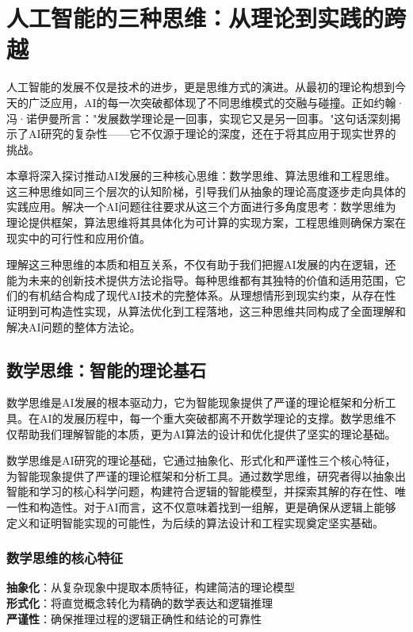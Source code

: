 
\chapter{人工智能的三种思维：从理论到实践的跨越}

人工智能的发展不仅是技术的进步，更是思维方式的演进。从最初的理论构想到今天的广泛应用，AI的每一次突破都体现了不同思维模式的交融与碰撞。正如约翰·冯·诺伊曼所言："发展数学理论是一回事，实现它又是另一回事。"这句话深刻揭示了AI研究的复杂性——它不仅源于理论的深度，还在于将其应用于现实世界的挑战。

本章将深入探讨推动AI发展的三种核心思维：数学思维、算法思维和工程思维。这三种思维如同三个层次的认知阶梯，引导我们从抽象的理论高度逐步走向具体的实践应用。解决一个AI问题往往要求从这三个方面进行多角度思考：数学思维为理论提供框架，算法思维将其具体化为可计算的实现方案，工程思维则确保方案在现实中的可行性和应用价值。

理解这三种思维的本质和相互关系，不仅有助于我们把握AI发展的内在逻辑，还能为未来的创新技术提供方法论指导。每种思维都有其独特的价值和适用范围，它们的有机结合构成了现代AI技术的完整体系。从理想情形到现实约束，从存在性证明到可构造性实现，从算法优化到工程落地，这三种思维共同构成了全面理解和解决AI问题的整体方法论。

\section{数学思维：智能的理论基石}

数学思维是AI发展的根本驱动力，它为智能现象提供了严谨的理论框架和分析工具。在AI的发展历程中，每一个重大突破都离不开数学理论的支撑。数学思维不仅帮助我们理解智能的本质，更为AI算法的设计和优化提供了坚实的理论基础。

数学思维是AI研究的理论基础，它通过抽象化、形式化和严谨性三个核心特征，为智能现象提供了严谨的理论框架和分析工具。通过数学思维，研究者得以抽象出智能和学习的核心科学问题，构建符合逻辑的智能模型，并探索其解的存在性、唯一性和构造性。对于AI而言，这不仅意味着找到一组解，更是确保从逻辑上能够定义和证明智能实现的可能性，为后续的算法设计和工程实现奠定坚实基础。

\subsection{数学思维的核心特征}

\begin{tcolorbox}[colback=blue!5!white,colframe=blue!75!black,title=核心概念：数学思维的三大特征]
\textbf{抽象化}：从复杂现象中提取本质特征，构建简洁的理论模型\\
\textbf{形式化}：将直觉概念转化为精确的数学表达和逻辑推理\\
\textbf{严谨性}：确保推理过程的逻辑正确性和结论的可靠性
\end{tcolorbox}

